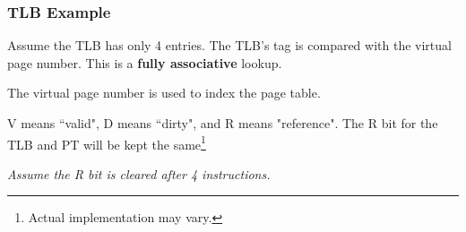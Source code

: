 \begin{frame}[fragile]\frametitle{TLB Example}
Assume the TLB has only 4 entries. The TLB's tag is compared with the virtual page number. This is a \textbf{fully associative} lookup. 
\hfill\break

The virtual page number is used to index the page table.
\hfill\break

V means ``valid", D means ``dirty", and R means "reference". The R bit for the TLB and PT will be kept the same\footnote{Actual implementation may vary.}
\hfill\break

\emph{Assume the R bit is cleared after 4 instructions.} 
\hfill\break


\end{frame}

